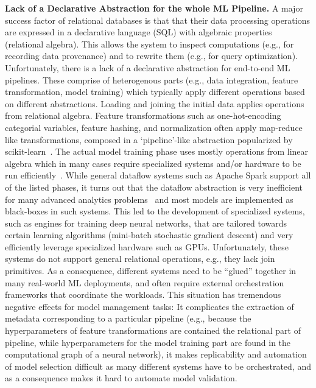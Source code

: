 \documentclass[11pt]{article}
\newcommand{\hdr}[1]{\noindent\textbf{#1.}}
\begin{document}
\hdr{Lack of a Declarative Abstraction for the whole ML Pipeline} A major success factor of relational databases is that that their data processing operations are expressed in a declarative language (SQL) with algebraic properties (relational algebra). This allows the system to inspect computations (e.g., for recording data provenance) and to rewrite them (e.g., for query optimization). Unfortunately, there is a lack of a declarative abstraction for end-to-end ML pipelines. These comprise of heterogenous parts (e.g., data integration, feature transformation, model training) which typically apply different operations based on different abstractions. Loading and joining the initial data applies operations from relational algebra. Feature transformations such as one-hot-encoding categorial variables, feature hashing, and normalization often apply map-reduce like transformations, composed in a `pipeline'-like abstraction popularized by scikit-learn~\cite{Pedregosa2011,Meng2015,Sparks2017}. The actual model training phase uses mostly operations from linear algebra which in many cases require specialized systems and/or hardware to be run efficiently~\cite{Abadi2016,Chen2015}. While general dataflow systems such as Apache Spark support all of the listed phases, it turns out that the dataflow abstraction is very inefficient for many advanced analytics problems~\cite{Mcsherry2015,Boden2017} and most models are implemented as black-boxes in such systems. This led to the development of specialized systems, such as engines for training deep neural networks, that are tailored towards certain learning algorithms (mini-batch stochastic gradient descent) and very efficiently leverage specialized hardware such as GPUs. Unfortunately, these systems do not support general relational operations, e.g., they lack join primitives.  As a consequence, different systems need to be ``glued'' together in many real-world ML deployments, and often require external orchestration frameworks that coordinate the workloads. This situation has tremendous negative effects for model management tasks: It complicates the extraction of metadata corresponding to a particular pipeline (e.g., because the hyperparameters of feature transformations are contained the relational part of pipeline, while hyperparameters for the model training part are found in the computational graph of a neural network), it makes replicability and automation of model selection difficult as many different systems have to be orchestrated, and as a consequence makes it hard to automate model validation.\\
\end{document}
